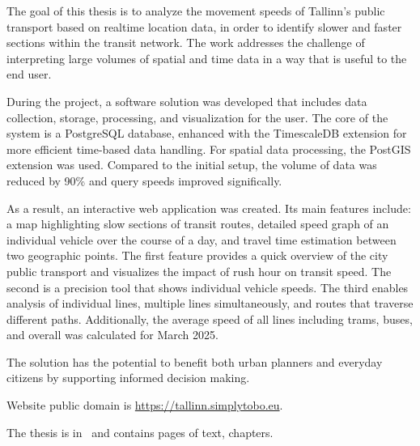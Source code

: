 The goal of this thesis is to analyze the movement speeds of Tallinn's public transport based on realtime location data, in order to identify slower and faster sections within the transit network. The work addresses the challenge of interpreting large volumes of spatial and time data in a way that is useful to the end user.

During the project, a software solution was developed that includes data collection, storage, processing, and visualization for the user. The core of the system is a PostgreSQL database, enhanced with the TimescaleDB extension for more efficient time-based data handling. For spatial data processing, the PostGIS extension was used. Compared to the initial setup, the volume of data was reduced by 90\% and query speeds improved significally.

As a result, an interactive web application was created. Its main features include: a map highlighting slow sections of transit routes, detailed speed graph of an individual vehicle over the course of a day, and travel time estimation between two geographic points. The first feature provides a quick overview of the city public transport and visualizes the impact of rush hour on transit speed. The second is a precision tool that shows individual vehicle speeds. The third enables analysis of individual lines, multiple lines simultaneously, and routes that traverse different paths. Additionally, the average speed of all lines including trams, buses, and overall was calculated for March 2025.

The solution has the potential to benefit both urban planners and everyday citizens by supporting informed decision making.

Website public domain is \url{https://tallinn.simplytobo.eu}.

The thesis is in \langEng~and contains \calculatepages pages of text, 
 chapters.